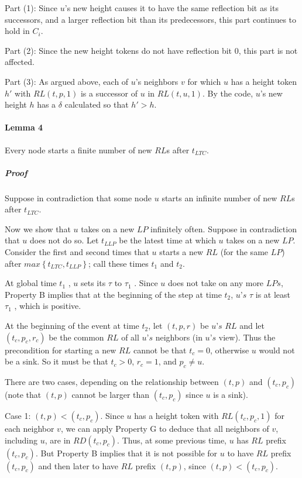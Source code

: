 Part (1): Since $u$'s new height causes it to have the same reflection bit as its successors, and a larger reflection bit than its predecessors, this part continues to hold in $C_i$.

Part (2): Since the new height tokens do not have reflection bit $0$, this part is not affected.

Part (3): As argued above, each of $u$'s neighbors $v$ for which $u$ has a height token $h'$ with $RL (t, p, 1)$ is a successor of $u$ in $RL (t, u, 1)$. By the code, $u$'s new height $h$ has a $\delta$ calculated so that $h' > h$.
\paragraph{Lemma 4} Every node starts a finite number of new $RL$s after $t_{LTC}$.

\subparagraph{Proof} Suppose in contradiction that some node $u$ starts an infinite number of new $RL$s after $t_{LTC}$.

Now we show that $u$ takes on a new $LP$ infinitely often. Suppose in contradiction that $u$ does not do so. Let $t_{LLP}$ be the latest time at which $u$ takes on a new $LP$. Consider the first and second times that $u$ starts a new $RL$ (for the same $LP$) after $max\left\lbrace t_{LTC}, t_{LLP} \right\rbrace $; call these times $t_1$ and $t_2$.

At global time $t_1$ , $u$ sets its $\tau$ to $\tau _1$ . Since $u$ does not take on any more $LPs$, Property B implies that at the beginning of the step at time $t_2$, $u’s$ $\tau$ is at least $\tau _1$ , which is positive.

At the beginning of the event at time $t_2$, let $(t, p, r)$ be $u’s$ $RL$ and let $(t_c, p_c, r_c)$ be the common $RL$ of all $u’s$ neighbors (in $u’s$ view). Thus the precondition for starting a new $RL$ cannot be that $t_c = 0$, otherwise $u$ would not be a sink. So it must be that $t_c > 0$, $r_c = 1$, and $p_c \neq u$.

There are two cases, depending on the relationship between $(t, p)$ and $(t_c , p_c )$ (note that $(t, p)$ cannot be larger than $(t_c , p_c )$ since $u$ is a sink).

Case 1: $(t, p) < (t_c , p_c )$. Since $u$ has a height token with $RL (t_c , p_c , 1)$ for each neighbor $v$, we can apply Property G to deduce that all neighbors of $v$, including $u$, are in $RD(t_c , p_c )$. Thus, at some previous time, $u$ has $RL$ prefix $(t_c , p_c )$. But Property B implies that it is not possible for $u$ to have $RL$ prefix $(t_c , p_c )$ and then later to have $RL$ prefix $(t, p)$, since $(t, p) < (t_c , p_c )$.

